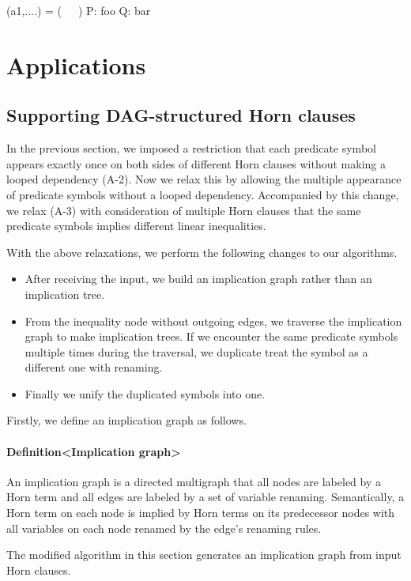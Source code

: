 \documentclass{llncs}
\begin{document}
(a1,....) = (~~~)
P: foo
Q: bar

\section{Applications}

\subsection{Supporting DAG-structured Horn clauses}

In the previous section, we imposed a restriction that each predicate symbol appears exactly once on both sides of different Horn clauses without making a looped dependency (A-2). Now we relax this by allowing the multiple appearance of predicate symbols without a looped dependency. Accompanied by this change, we relax (A-3) with consideration of multiple Horn clauses that the same predicate symbols implies different linear inequalities.

With the above relaxations, we perform the following changes to our algorithms.

\begin{itemize}
\item After receiving the input, we build an implication graph rather than an implication tree.
\item From the inequality node without outgoing edges, we traverse the implication graph to make implication trees. If we encounter the same predicate symbols multiple times during the traversal, we duplicate treat the symbol as a different one with renaming.
\item Finally we unify the duplicated symbols into one.
\end{itemize}

Firstly, we define an implication graph as follows.

\paragraph{Definition<Implication graph>} An implication graph is a directed multigraph that all nodes are labeled by a Horn term and all edges are labeled by a set of variable renaming. Semantically, a Horn term on each node is implied by Horn terms on its predecessor nodes with all variables on each node renamed by the edge's renaming rules.

The modified algorithm in this section generates an implication graph from input Horn clauses.
\end{document}
